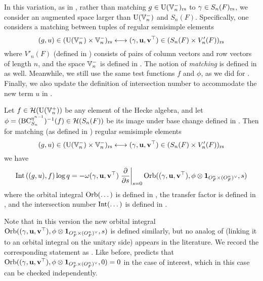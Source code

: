 In this variation, as in \cite{ref:liuFJ},
rather than matching $g \in \operatorname{U}(\mathbb V_n^-)_{\mathrm{rs}}$ to $\gamma \in S_n(F)_{\mathrm{rs}}$,
we consider an augmented space larger than $\operatorname{U}(\mathbb V_n^-)$ and $S_n(F)$.
Specifically, one considers a matching between tuples of regular semisimple elements
\[ (g, u) \in (\operatorname{U}(\mathbb V_n^-) \times \mathbb V_n^-)_{\mathrm{rs}}
  \longleftrightarrow (\gamma, \mathbf u, \mathbf v^\top) \in (S_n(F) \times V'_n(F))_{\mathrm{rs}} \]
where $V'_n(F)$ (defined in )
consists of pairs of column vectors and row vectors of length $n$,
and the space $\mathbb V_n^-$ is defined in .
The notion of \emph{matching} is defined in  as well.
Meanwhile, we still use the same test functions $f$ and $\phi$,
as we did for \cite[Conjecture 6.2.1]{ref:AFLspherical}.
Finally, we also update the definition of intersection number
to accommodate the new term $u$ in .

\begin{conjecture}
  Let $f \in \mathcal H(\operatorname{U}(\mathbb V_n^+))$ be any element of the Hecke algebra,
  and let $\phi = (\operatorname{BC}_{S_n}^{\eta^{n-1}})^{-1}(f) \in \mathcal H(S_n(F))$ be its image
  under base change defined in .
  Then for matching (as defined in ) regular semisimple elements
  \[ (g, u) \in (\operatorname{U}(\mathbb V_n^-) \times \mathbb V_n^-)_{\mathrm{rs}} \longleftrightarrow
    {(\gamma, \mathbf u, \mathbf v^\top)} \in (S_n(F) \times V'_n(F))_{\mathrm{rs}} \]
  we have
  \begin{equation}
    \operatorname{Int}\left( (g,u), f \right) \log q \\
    = -\omega{(\gamma, \mathbf u, \mathbf v^\top)} \left. \pdv{}{s} \right\rvert_{s=0}
    \operatorname{Orb}({(\gamma, \mathbf u, \mathbf v^\top)}, \phi \otimes \mathbf{1}_{O_F^n \times (O_F^n)^\vee}, s)
  \end{equation}
  where the orbital integral $\operatorname{Orb}(\dots)$ is defined in ,
  the transfer factor is defined in ,
  and the intersection number $\operatorname{Int}(\dots)$ is defined in .
  \label{conj:semi_lie_spherical}
\end{conjecture}
Note that in this version the new orbital integral $\operatorname{Orb}({(\gamma, \mathbf u, \mathbf v^\top)}, \phi \otimes \mathbf{1}_{O_F^n \times (O_F^n)^\vee}, s)$
is defined similarly, but no analog of 
(linking it to an orbital integral on the unitary side) appears in the literature.
We record the corresponding statement as .
Like before, 
predicts that $\operatorname{Orb}({(\gamma, \mathbf u, \mathbf v^\top)}, \phi \otimes \mathbf{1}_{O_F^n \times (O_F^n)^\vee}, 0) = 0$ in the case of interest,
which in this case can be checked independently.

